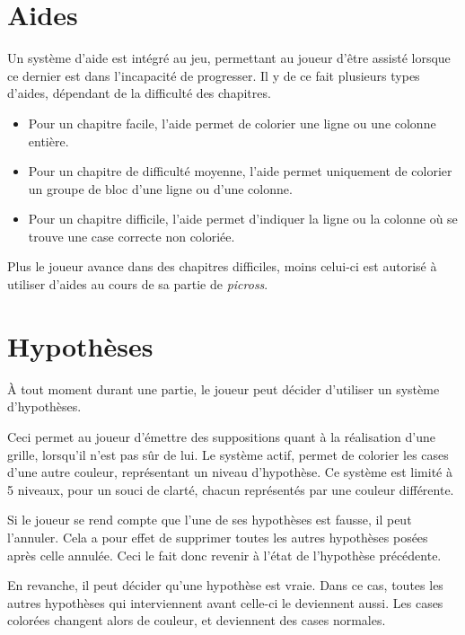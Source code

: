 \documentclass[a4paper, 12pt]{report}
\begin{document}
		\section{Aides}
		
			Un système d'aide est intégré au jeu, permettant au joueur d'être assisté lorsque ce dernier est dans l'incapacité de progresser. Il y de ce fait plusieurs types d'aides, dépendant de la difficulté des chapitres.
			\begin{itemize}
			\item Pour un chapitre facile, l'aide permet de colorier une ligne ou une colonne entière. 
			
			\item Pour un chapitre de difficulté moyenne, l'aide permet uniquement de colorier un groupe de bloc d'une ligne ou d'une colonne. 
			
			\item Pour un chapitre difficile, l'aide permet d'indiquer la ligne ou la colonne où se trouve une case correcte non coloriée. 
			\end{itemize}
			
			Plus le joueur avance dans des chapitres difficiles, moins celui-ci est autorisé à utiliser d'aides au cours de sa partie de \textit{picross}. 

		\section{Hypothèses}	
		
			À tout moment durant une partie, le joueur peut décider d'utiliser un système d'hypothèses. 
			
			Ceci permet au joueur d'émettre des suppositions quant à la réalisation d'une grille, lorsqu'il n'est pas sûr de lui. Le système actif, permet de colorier les cases d'une autre couleur, représentant un niveau d'hypothèse. Ce système est limité à 5 niveaux, pour un souci de clarté, chacun représentés par une couleur différente.
			
			Si le joueur se rend compte que l'une de ses hypothèses est fausse, il peut l'annuler. Cela a pour effet de supprimer toutes les autres hypothèses posées après celle annulée. Ceci le fait donc revenir à l'état de l'hypothèse précédente.
			
			En revanche, il peut décider qu'une hypothèse est vraie. Dans ce cas, toutes les autres hypothèses qui interviennent avant celle-ci le deviennent aussi. Les cases colorées changent alors de couleur, et deviennent des cases normales.
\end{document}
